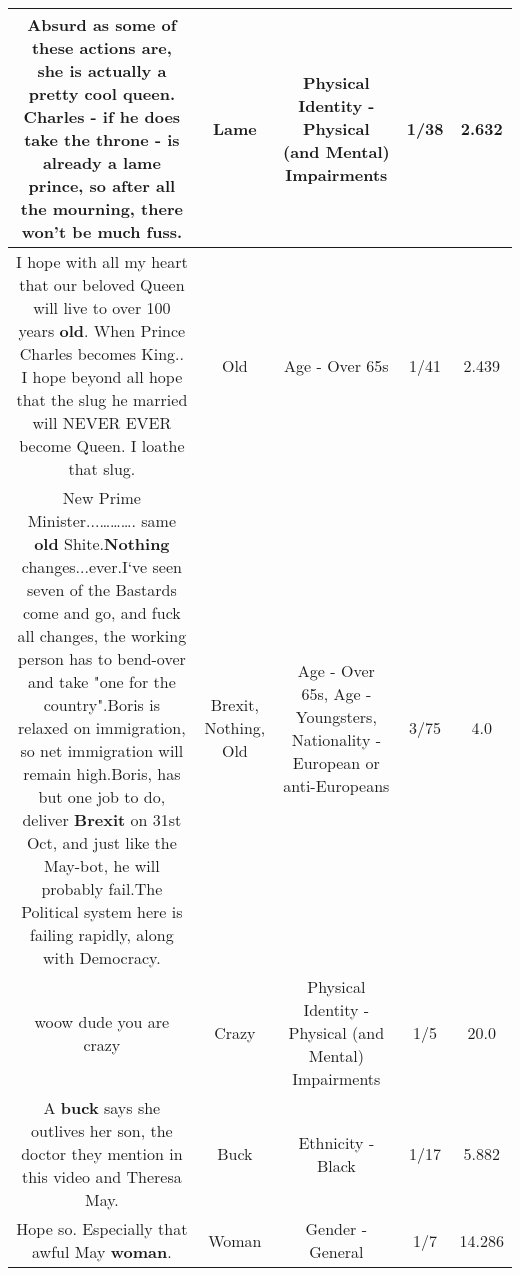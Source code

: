 \documentclass[11pt]{article}
\newlength\mylength
\begin{document}
\begin{center}
\begin{longtable}{|C{.65\mylength}|C{.30\mylength}|C{.12\mylength}|C{.12\mylength}|C{.12\mylength}|}
  \small Absurd as some of these actions are, she is actually a pretty cool queen.  Charles - if he does take the throne - is already a \textbf{lame} prince, so after all the mourning, there won't be much fuss.\normalsize   & Lame & Physical Identity - Physical (and Mental) Impairments & 1/38 & 2.632 \\  \hline
  \small I hope with all my heart that our beloved Queen will live to over 100 years \textbf{old}. When Prince Charles becomes King.. I hope beyond all hope that the slug he married will NEVER EVER become Queen. I loathe that slug.\normalsize   & Old & Age - Over 65s & 1/41 & 2.439 \\  \hline
  \small New Prime Minister...……….  same \textbf{old} Shite.\textbf{Nothing} changes...ever.I`ve seen seven of the Bastards come and go, and fuck all changes, the working person has to bend-over and take "one for the country".Boris is relaxed on immigration, so net immigration will remain high.Boris, has but one job to do, deliver \textbf{Brexit} on 31st Oct, and just like the May-bot, he will probably fail.The Political system here is failing rapidly, along with Democracy.\normalsize   & Brexit, Nothing, Old & Age - Over 65s, Age - Youngsters, Nationality - European or anti-Europeans & 3/75 & 4.0 \\  \hline
  \small woow dude you are crazy\normalsize   & Crazy & Physical Identity - Physical (and Mental) Impairments & 1/5 & 20.0 \\  \hline
  \small A \textbf{buck} says she outlives her son, the doctor they mention in this video and Theresa May.\normalsize   & Buck & Ethnicity - Black & 1/17 & 5.882 \\  \hline
  \small Hope so. Especially that awful May \textbf{woman}.\normalsize   & Woman & Gender - General & 1/7 & 14.286 \\  \hline

\end{longtable}
\end{center}
\end{document}

